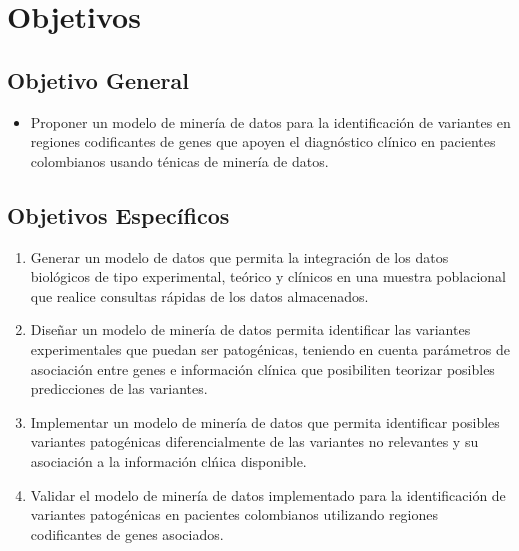 \chapter{Objetivos}

\section*{Objetivo General}%

\begin{itemize}
	\item Proponer un modelo de miner\'ia de datos para la identificaci\'on de variantes en regiones codificantes de genes  que apoyen el  diagn\'ostico cl\'inico en pacientes colombianos usando t\'enicas de miner\'ia de datos.
\end{itemize}

\section*{Objetivos Espec\'ificos}

\begin{enumerate}
	\item Generar un modelo de datos que permita la integraci\'on de los datos biol\'ogicos de tipo experimental, te\'orico y cl\'inicos en una  muestra poblacional que realice consultas r\'apidas de los datos almacenados.
	\item Dise\~nar un modelo de miner\'ia de datos permita identificar las variantes experimentales que puedan ser patog\'enicas, teniendo en cuenta par\'ametros de asociaci\'on entre genes e informaci\'on cl\'inica que posibiliten teorizar posibles predicciones de las variantes. 
	\item Implementar un  modelo de miner\'ia de datos que permita identificar posibles variantes patog\'enicas diferencialmente de las variantes no relevantes y  su asociaci\'on a la informaci\'on cl\'nica disponible.
	\item Validar el modelo de miner\'ia de datos implementado para la identificaci\'on de variantes patog\'enicas en pacientes colombianos utilizando regiones codificantes de genes asociados.  
\end{enumerate}





